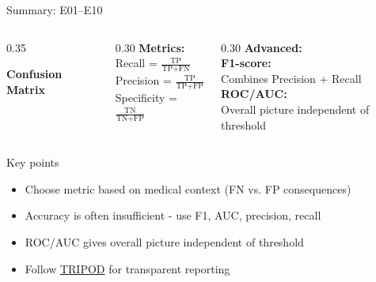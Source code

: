 \documentclass[aspectratio=169, 10pt]{beamer}
\begin{document}
\begin{frame}{Summary: E01--E10}

    \begin{columns}[T]
        \begin{column}{0.35\textwidth}
            \begin{center}
                \textbf{Confusion Matrix}\\[2mm]
            \end{center}
        \end{column}
        \begin{column}{0.30\textwidth}
            \textbf{Metrics:}\\[1mm]
            \footnotesize
            Recall = $\frac{\text{TP}}{\text{TP}+\text{FN}}$\\[2mm]
            Precision = $\frac{\text{TP}}{\text{TP}+\text{FP}}$\\[2mm]
            Specificity = $\frac{\text{TN}}{\text{TN}+\text{FP}}$
        \end{column}
        \begin{column}{0.30\textwidth}
            \textbf{Advanced:}\\[1mm]
            \footnotesize
            \textbf{F1-score:}\\
            Combines Precision + Recall\\[2mm]
            \textbf{ROC/AUC:}\\
            Overall picture independent of threshold
        \end{column}
    \end{columns}

    \vspace{3mm}

    \begin{block}{\footnotesize Key points}
        \footnotesize
        \begin{itemize}
            \item Choose metric based on medical context (FN vs. FP consequences)
            \item Accuracy is often insufficient - use F1, AUC, precision, recall
            \item ROC/AUC gives overall picture independent of threshold
            \item Follow \href{https://www.tripod-statement.org/}{TRIPOD} for transparent reporting
        \end{itemize}
    \end{block}

\end{frame}
\end{document}
